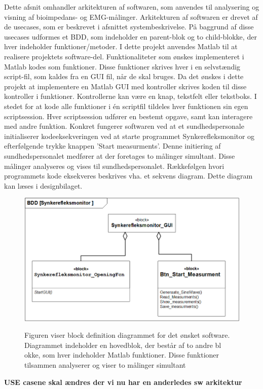 Dette afsnit omhandler arkitekturen af   softwaren, som anvendes til analysering og visning af bioimpedans- og EMG-målinger. Arkitekturen af softwaren er drevet af de usecases, som er beskrevet i afsnittet systembeskrivelse. På baggrund af disse usecases udformes et BDD, som indeholder en parent-blok og to child-blokke, der hver indeholder funktioner/metoder.
I dette projekt anvendes  Matlab til at realisere projektets  software-del.  Funktionaliteter som ønskes implementeret i Matlab kodes som funktioner. Disse funktioner skrives hver i en selvstændig script-fil, som kaldes fra en GUI fil, når de skal bruges. Da det ønskes i dette projekt at implementere en Matlab GUI med kontroller skrives koden til disse kontroller i funktioner. Kontrollerne kan være en knap, tekstfelt eller tekstboks. I stedet for at kode alle funktioner i én scriptfil tildeles hver funktionen sin egen scriptsession. Hver scriptsession udfører en bestemt opgave, samt kan interagere med andre funktion. Konkret fungerer softwaren ved at et sundhedspersonale initialiserer kodeeksekveringen ved at starte programmet Synkerefleksmonitor og efterfølgende trykke knappen ’Start measurments'. Denne initiering af sundhedspersonalet medfører at der foretages to målinger simultant. Disse målinger analyseres og vises til sundhedspersonalet. Rækkefølgen hvori programmets kode eksekveres beskrives vha. et sekvens diagram. Dette diagram kan læses i designbilaget.    


\begin{figure}[H] 
\centering
{\includegraphics[width=\linewidth]
{Figure/SWIBD}}
\caption{Figuren viser block definition diagrammet for det ønsket software. Diagrammet indeholder en hovedblok, der består af to andre bl  okke, som hver indeholder Matlab funktioner. Disse funktioner tilsammen analyserer og viser to målinger simultant  }
\label{figScrip}
\end{figure}

\textbf{USE casene skal ændres der vi nu har en anderledes sw arkitektur}

\citep{Aroom2009}

